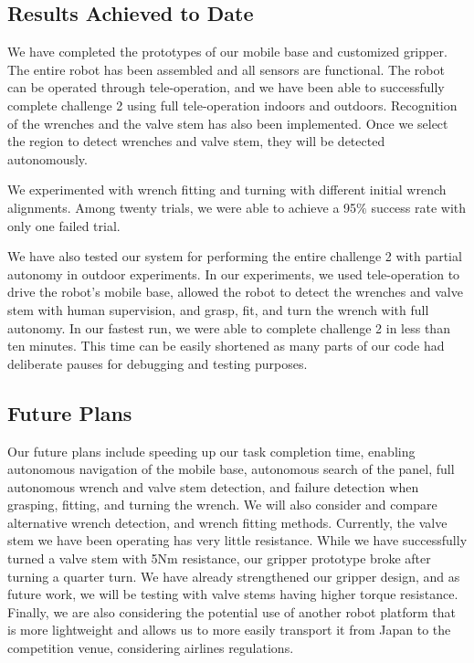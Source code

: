\documentclass{standalone}
\begin{document}
\subsection{Results Achieved to Date}
We have completed the prototypes of our mobile base and customized gripper. The entire robot has been assembled and all sensors are functional. The robot can be operated through tele-operation, and we have been able to successfully complete challenge 2 using full tele-operation indoors and outdoors. 
Recognition of the wrenches and the valve stem has also been implemented. Once we select the region to detect wrenches and valve stem, they will be detected autonomously.

We experimented with wrench fitting and turning with different initial wrench alignments. Among twenty trials, we were able to achieve a 95$\%$ success rate with only one failed trial. 

We have also tested our system for performing the entire challenge 2 with partial autonomy in outdoor experiments. In our experiments, we used tele-operation to drive the robot’s mobile base, allowed the robot to detect the wrenches and valve stem with human supervision, and grasp, fit, and turn the wrench with full autonomy. In our fastest run, we were able to complete challenge 2 in less than ten minutes. This time can be easily shortened as many parts of our code had deliberate pauses for debugging and testing purposes.

\subsection{Future Plans}
Our future plans include speeding up our task completion time, enabling autonomous navigation of the mobile base, autonomous search of the panel, full autonomous wrench and valve stem detection, and failure detection when grasping, fitting, and turning the wrench. We will also consider and compare alternative wrench detection, and wrench fitting methods. Currently, the valve stem we have been operating has very little resistance. While we have successfully turned a valve stem with 5Nm resistance, our gripper prototype broke after turning a quarter turn. We have already strengthened our gripper design, and as future work, we will be testing with valve stems having higher torque resistance.  Finally, we are also considering the potential use of another robot platform that is more lightweight and allows us to more easily transport it from Japan to the competition venue, considering airlines regulations. 
\end{document}
